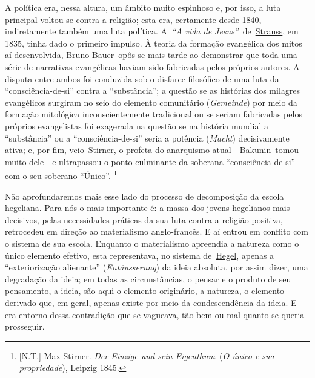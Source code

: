 A política era, nessa altura, um âmbito muito espinhoso e, por isso, a
luta principal voltou-se contra a religião; esta era, certamente desde
1840, indiretamente também uma luta política.
A\emph{~}\protect\hypertarget{r7}{}{}\emph{``A vida de
Jesus''}~de~\href{https://www.marxists.org/portugues/dicionario/verbetes/s/strauss_david.htm}{Strauss},
em 1835, tinha dado o primeiro impulso. À teoria da formação evangélica
dos mitos aí desenvolvida,
\href{https://www.marxists.org/portugues/dicionario/verbetes/b/bauer-b.htm}{Bruno
Bauer}~opôs-se mais tarde ao demonstrar que toda uma série de narrativas
evangélicas haviam sido fabricadas pelos próprios autores. A disputa
entre ambos foi conduzida sob o disfarce filosófico de uma luta da
``consciência-de-si'' contra a ``substância''; a questão se as histórias
dos milagres evangélicos surgiram no seio do elemento comunitário
(\emph{Gemeinde}) por meio da formação mitológica inconscientemente
tradicional ou se seriam fabricadas pelos próprios evangelistas foi
exagerada na questão se na história mundial a ``substância'' ou a
``consciência-de-si'' seria a potência (\emph{Macht}) decisivamente
ativa; e, por fim,
veio~\href{https://www.marxists.org/portugues/dicionario/verbetes/s/stirner.htm}{Stirner},
o profeta do anarquismo atual - Bakunin~tomou muito dele - e ultrapassou
o ponto culminante da soberana ``consciência-de-si'' com o seu soberano
``Único''\protect\hypertarget{r8}{}{}. \footnote{{[}N.T.{]} Max Stirner.
  \emph{Der Einzige und sein Eigenthum~}(\emph{O único e sua
  propriedade}), Leipzig 1845.}

Não aprofundaremos mais esse lado do processo de decomposição da escola
hegeliana. Para nós o mais importante é: a massa dos jovens hegelianos
mais decisivos, pelas necessidades práticas da sua luta contra a
religião positiva, retrocedeu em direção ao materialismo anglo-francês.
E aí entrou em conflito com o sistema de sua escola. Enquanto o
materialismo apreendia a natureza como o único elemento efetivo, esta
representava, no sistema
de~\href{https://www.marxists.org/portugues/dicionario/verbetes/h/hegel.htm}{Hegel},
apenas a ``exteriorização alienante'' (\emph{Entäusserung}) da ideia
absoluta, por assim dizer, uma degradação da ideia; em todas as
circunstâncias, o pensar e o produto de seu pensamento, a ideia, são
aqui o elemento originário, a natureza, o elemento derivado que, em
geral, apenas existe por meio da condescendência da ideia. E era entorno
dessa contradição que se vagueava, tão bem ou mal quanto se queria
prosseguir.

